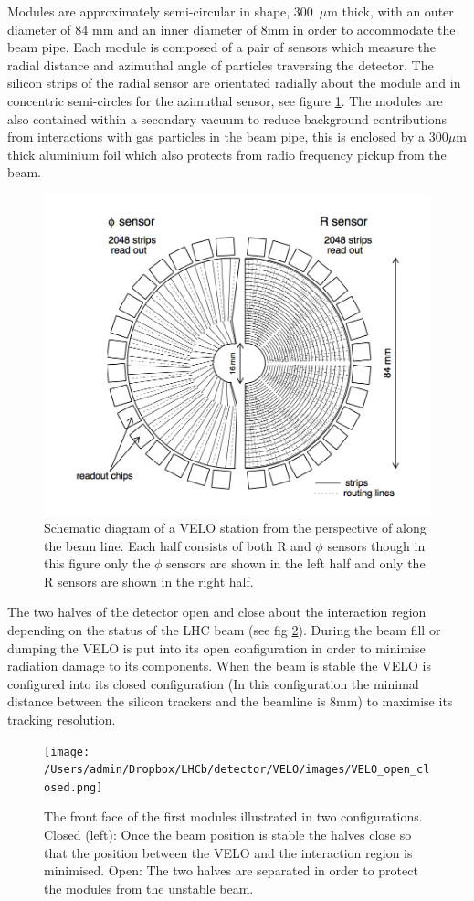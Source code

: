 Modules are approximately semi-circular in shape, 300 \,$\mu$m thick, with an outer diameter of 84 mm and an inner diameter of 8mm in order to accommodate the beam pipe. Each module is composed of a pair of sensors which measure the radial distance and azimuthal angle of particles traversing the detector. The silicon strips of the radial sensor are orientated radially about the module and in concentric semi-circles for the azimuthal sensor, see figure \ref{fig: r-phi sensors}. The modules are also contained within a secondary vacuum to reduce background contributions from interactions with gas particles in the beam pipe, this is enclosed by a 300$\mu$m thick aluminium foil which also protects from radio frequency pickup from the beam.

\begin{figure}
	\centering
	\includegraphics[width=0.5\columnwidth]{Chapters/detector/images/r-phi_sensors.png}
	\caption{Schematic diagram of a VELO station from the perspective of along the beam line. Each half consists of both R and $\phi$ sensors though in this figure only the $\phi$ sensors are shown in the left half and only the R sensors are shown in the right half.}
	\label{fig: r-phi sensors}
\end{figure}

The two halves of the detector open and close about the interaction region depending on the status of the LHC beam (see fig \ref{fig: VELO layout}). During the beam fill or dumping the VELO is put into its open configuration in order to minimise radiation damage to its components. When the beam is stable the VELO is configured into its closed configuration (In this configuration the minimal distance between the silicon trackers and the beamline is 8mm) to maximise its tracking resolution.

\begin{figure}
	\centering
	\texttt{[image: /Users/admin/Dropbox/LHCb/detector/VELO/images/VELO\_open\_closed.png]}
	\caption{The front face of the first modules illustrated in two configurations. Closed (left): Once the beam position is stable the halves close so that the position between the VELO and the interaction region is minimised. Open: The two halves are separated in order to protect the modules from the unstable beam.}
	\label{fig: VELO layout}
\end{figure}

